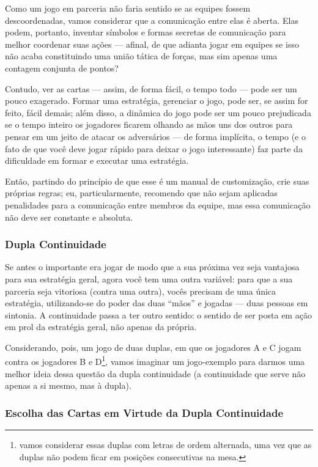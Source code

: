 Como um jogo em parceria não faria sentido se as equipes fossem descoordenadas, vamos considerar que a comunicação entre elas é aberta. Elas podem, portanto, inventar símbolos e formas secretas de comunicação para melhor coordenar suas ações --- afinal, de que adianta jogar em equipes se isso não acaba constituindo uma união tática de forças, mas sim apenas uma contagem conjunta de pontos?

Contudo, ver as cartas --- assim, de forma fácil, o tempo todo --- pode ser um pouco exagerado. Formar uma estratégia, gerenciar o jogo, pode ser, se assim for feito, fácil demais; além disso, a dinâmica do jogo pode ser um pouco prejudicada se o tempo inteiro os jogadores ficarem olhando as mãos uns dos outros para pensar em um jeito de atacar os adversários --- de forma implícita, o tempo (e o fato de que você deve jogar rápido para deixar o jogo interessante) faz parte da dificuldade em formar e executar uma estratégia.

Então, partindo do princípio de que esse é um manual de customização, crie suas próprias regras; eu, particularmente, recomendo que não sejam aplicadas penalidades para a comunicação entre membros da equipe, mas essa comunicação não deve ser constante e absoluta.

\subsubsection{Dupla Continuidade}

Se antes o importante era jogar de modo que a sua próxima vez seja vantajosa para sua estratégia geral, agora você tem uma outra variável: para que a sua parceria seja vitoriosa (contra uma outra), vocês precisam de uma única estratégia, utilizando-se do poder das duas ``mãos'' e jogadas --- duas pessoas em sintonia. A continuidade passa a ter outro sentido: o sentido de ser posta em ação em prol da estratégia geral, não apenas da própria.

Considerando, pois, um jogo de duas duplas, em que os jogadores A e C jogam contra os jogadores B e D\footnote{vamos considerar essas duplas com letras de ordem alternada, uma vez que as duplas não podem ficar em posições consecutivas na mesa.}, vamos imaginar um jogo-exemplo para darmos uma melhor ideia dessa questão da dupla continuidade (a continuidade que serve não apenas a si mesmo, mas à dupla).

\subsubsection{Escolha das Cartas em Virtude da Dupla Continuidade}

